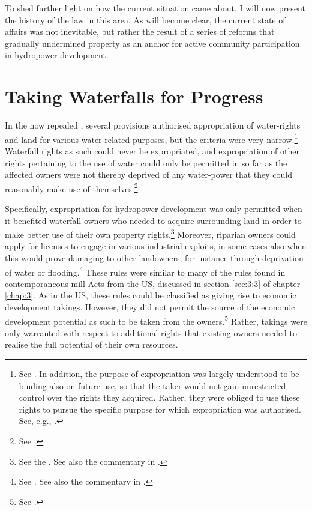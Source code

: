 To shed further light on how the current situation came about, I will now present the history of the law in this area. As will become clear, the current state of affairs was not inevitable, but rather the result of a series of reforms that gradually undermined property as an anchor for active community participation in hydropower development.

\section{Taking Waterfalls for Progress}\label{sec:5:4}

In the now repealed \cite{wra88}, several provisions authorised appropriation of water-rights and land for various water-related purposes, but the criteria were very narrow.\footnote{See \cite[69-85]{dahl88}. In addition, the purpose of expropriation was largely understood to be binding also on future use, so that the taker would not gain unrestricted control over the rights they acquired. Rather, they were obliged to use these rights to pursue the specific purpose for which expropriation was authorised. See, e.g., \cite[133-140]{rygh12}.} Waterfall rights as such could never be expropriated, and expropriation of other rights pertaining to the use of water could only be permitted in so far as the affected owners were not thereby deprived of any water-power that they could reasonably make use of themselves.\footnote{See \cite[58|60]{dahl88}.}

Specifically, expropriation for hydropower development was only permitted when it benefited waterfall owners who needed to acquire surrounding land in order to make better use of their own property rights.\footnote{See the \dni\cite[15, 16]{wra88}. See also the commentary in \cite[60-65]{dahl88}.} Moreover, riparian owners could apply for licenses to engage in various industrial exploits, in some cases also when this would prove damaging to other landowners, for instance through deprivation of water or flooding.\footnote{See \dni\cite[14]{wra88}. See also the commentary in \cite[54-60]{dahl88}.} These rules were similar to many of the rules found in contemporaneous mill Acts from the US, discussed in section \ref{sec:3:3} of chapter \ref{chap:3}. As in the US, these rules could be classified as giving rise to economic development takings. However, they did not permit the source of the economic development potential as such to be taken from the owners.\footnote{See \cite[168-170]{dahl88}.} Rather, takings were only warranted with respect to additional rights that existing owners needed to realise the full potential of their own resources.


